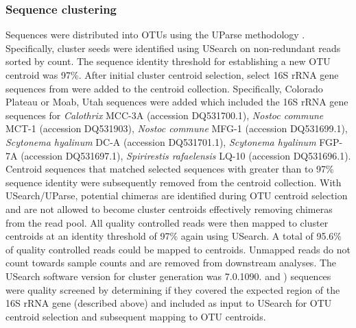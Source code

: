 \subsubsection{Sequence clustering}
Sequences were distributed into OTUs using the UParse methodology
\citep{23955772}. Specifically, cluster seeds were identified using USearch on
non-redundant reads sorted by count. The sequence
identity threshold for establishing a new OTU centroid was 97\%. After initial
cluster centroid selection, select 16S rRNA gene sequences from \citet{Yeager}
were added to the centroid collection. Specifically, \citet{Yeager} Colorado
Plateau or Moab, Utah sequences were added which included the 16S rRNA gene
sequences for \textit{Calothrix} MCC-3A (accession DQ531700.1), \textit{Nostoc
commune} MCT-1 (accession DQ531903), \textit{Nostoc commune} MFG-1 (accession
DQ531699.1), \textit{Scytonema hyalinum} DC-A (accession DQ531701.1),
\textit{Scytonema hyalinum} FGP-7A (accession DQ531697.1), \textit{Spirirestis
rafaelensis} LQ-10 (accession DQ531696.1).  Centroid sequences that matched
selected \citet{Yeager} sequences with greater than to 97\% sequence identity
were subsequently removed from the centroid collection. With USearch/UParse,
potential chimeras are identified during OTU centroid selection and are not
allowed to become cluster centroids effectively removing chimeras from the read
pool. All quality controlled reads were then mapped to cluster centroids at an
identity threshold of 97\% again using USearch. A total of 95.6\% of quality
controlled reads could be mapped to centroids. Unmapped reads do not count
towards sample counts and are removed from downstream analyses. The
USearch software version for cluster generation was 7.0.1090.
\citet{Garcia_Pichel_2013} and \citet{Steven_2013}) sequences were quality
screened by determining if they covered the expected region of the 16S rRNA
gene (described above) and included as input to USearch for OTU centroid
selection and subsequent mapping to OTU centroids. 

